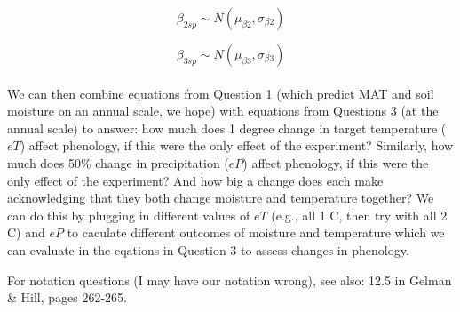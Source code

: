 \documentclass[12pt,a4paper]{article}
\begin{document}
\begin{equation}
\beta_{2 sp} \sim N(\mu_{\beta2}, \sigma_{\beta2})
\end{equation}

\begin{equation}
\beta_{3 sp} \sim N(\mu_{\beta3}, \sigma_{\beta3})
\end{equation}
\vspace{2ex}\\

\noindent We can then combine equations from Question 1 (which predict MAT and soil moisture on an annual scale, we hope) with equations from Questions 3 (at the annual scale) to answer: how much does 1 degree change in target temperature ($eT$) affect phenology, if this were the only effect of the experiment? Similarly, how much does 50\% change in precipitation ($eP$) affect phenology, if this were the only effect of the experiment? And how big a change does each make acknowledging that they both change moisture and temperature together? We can do this by plugging in different values of $eT$ (e.g., all 1 C, then try with all 2 C) and $eP$ to caculate different outcomes of moisture and temperature which we can evaluate in the eqations in Question 3 to assess changes in phenology. 

\noindent For notation questions (I may have our notation wrong), see also: 12.5 in Gelman \& Hill, pages 262-265.
\end{document}
